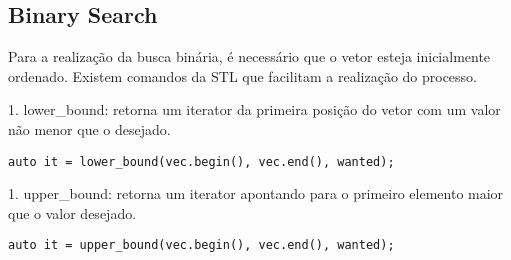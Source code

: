 \subsection{Binary Search}
Para a realização da busca binária, é necessário que o vetor esteja inicialmente ordenado. Existem comandos da STL que facilitam a realização do processo.

1. lower\_bound: retorna um iterator da primeira posição do vetor com um valor não menor que o desejado.
\begin{verbatim}
auto it = lower_bound(vec.begin(), vec.end(), wanted);
\end{verbatim}

1. upper\_bound: retorna um iterator apontando para o primeiro elemento maior que o valor desejado.
\begin{verbatim}
auto it = upper_bound(vec.begin(), vec.end(), wanted);
\end{verbatim}


